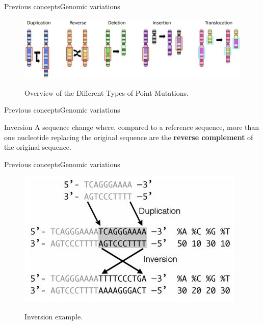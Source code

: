 \documentclass[10pt]{beamer}
\begin{document}
{%
\begin{frame}{Previous concepts}{Genomic variations}
	\begin{figure}[]
		\centering
		\includegraphics[width=\textwidth,height=0.7\textheight,keepaspectratio]{img/alignment/block_mutations_med.jpg}
		\label{img:alig}
		\caption{Overview of the Different Types of Point Mutations.}
	\end{figure}
\end{frame}

\begin{frame}{Previous concepts}{Genomic variations}
\begin{block}{Inversion}
	A sequence change where, compared to a reference sequence, more than one nucleotide replacing the original sequence are the \textbf{reverse complement} of the original sequence.	
\end{block}
\end{frame}

\begin{frame}{Previous concepts}{Genomic variations}
	\begin{figure}[]
		\centering
		\includegraphics[width=\textwidth,height=0.5\textheight,keepaspectratio]{img/alignment/inv1.jpg}
		\label{img:alig}
		\caption{Inversion example.}
	\end{figure}
\end{frame}


}
\end{document}
